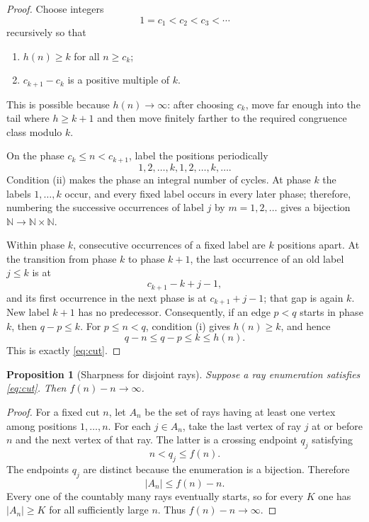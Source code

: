 \documentclass[11pt]{article}
\newtheorem{proposition}{Proposition}
\theoremstyle{remark}
\newcommand{\N}{\mathbb N}
\begin{document}
\begin{proof}
Choose integers
\[
 1=c_1<c_2<c_3<\cdots
\]
recursively so that
\begin{enumerate}[label=(\roman*)]
\item $h(n)\geq k$ for all $n\geq c_k$;
\item $c_{k+1}-c_k$ is a positive multiple of $k$.
\end{enumerate}
This is possible because $h(n)\to\infty$: after choosing $c_k$, move far
enough into the tail where $h\geq k+1$ and then move finitely farther to the
required congruence class modulo $k$.

On the phase $c_k\leq n<c_{k+1}$, label the positions periodically
\[
 1,2,\ldots,k,1,2,\ldots,k,\ldots .
\]
Condition (ii) makes the phase an integral number of cycles.  At phase $k$ the
labels $1,\ldots,k$ occur, and every fixed label occurs in every later phase;
therefore, numbering the successive occurrences of label $j$ by
$m=1,2,\ldots$ gives a bijection $\N\to\N\times\N$.

Within phase $k$, consecutive occurrences of a fixed label are $k$ positions
apart.  At the transition from phase $k$ to phase $k+1$, the last occurrence
of an old label $j\leq k$ is at
\[
 c_{k+1}-k+j-1,
\]
and its first occurrence in the next phase is at $c_{k+1}+j-1$; that gap is
again $k$.  New label $k+1$ has no predecessor.  Consequently, if an edge
$p<q$ starts in phase $k$, then $q-p\leq k$.  For $p\leq n<q$, condition (i)
gives $h(n)\geq k$, and hence
\[
 q-n\leq q-p\leq k\leq h(n).
\]
This is exactly \eqref{eq:cut}.
\end{proof}

\begin{proposition}[Sharpness for disjoint rays]\label{prop:sharp}
Suppose a ray enumeration satisfies \eqref{eq:cut}.  Then
$f(n)-n\to\infty$.
\end{proposition}

\begin{proof}
For a fixed cut $n$, let $A_n$ be the set of rays having at least one vertex
among positions $1,\ldots,n$.  For each $j\in A_n$, take the last vertex of
ray $j$ at or before $n$ and the next vertex of that ray.  The latter is a
crossing endpoint $q_j$ satisfying
\[
 n<q_j\leq f(n).
\]
The endpoints $q_j$ are distinct because the enumeration is a bijection.
Therefore
\[
 |A_n|\leq f(n)-n.
\]
Every one of the countably many rays eventually starts, so for every $K$ one
has $|A_n|\geq K$ for all sufficiently large $n$.  Thus $f(n)-n\to\infty$.
\end{proof}
\end{document}

